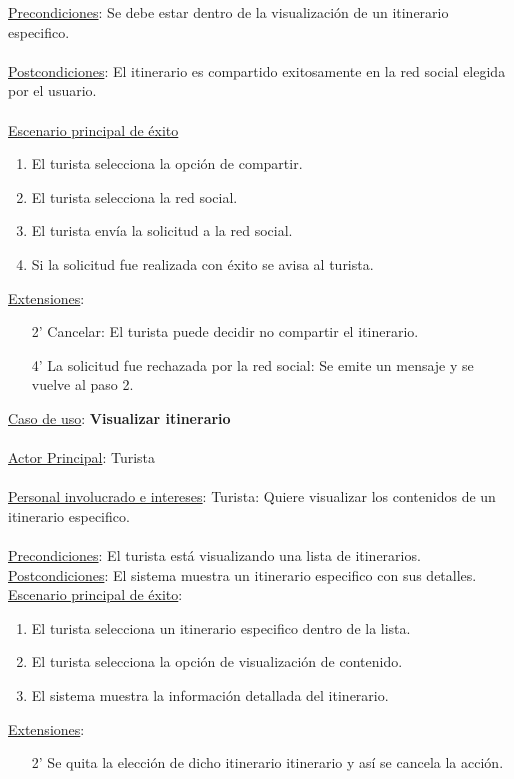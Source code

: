 \documentclass[12pt]{article}
\begin{document}
\underline{Precondiciones}: Se debe estar dentro de la visualización de un itinerario especifico.\\\\
\underline{Postcondiciones}: El itinerario es compartido exitosamente en la red social elegida por el usuario.\\\\
\underline{Escenario principal de éxito}
\begin{enumerate}
\item El turista selecciona la opción de compartir.
\item El turista selecciona la red social.
\item El turista envía la solicitud a la red social.
\item Si la solicitud fue realizada con éxito se avisa al turista.
\end{enumerate}
\underline{Extensiones}:
\begin{enumerate}
\item[2'] Cancelar: El turista puede decidir no compartir el itinerario.
\item[4'] La solicitud fue rechazada por la red social: Se emite un mensaje y se vuelve al paso 2.
\end{enumerate}
\underline{Caso de uso}: \textbf{Visualizar itinerario}\\\\
\underline{Actor Principal}: Turista\\\\
\underline{Personal involucrado e intereses}: Turista: Quiere visualizar los contenidos de un itinerario especifico.\\\\
\underline{Precondiciones}:  El turista está visualizando una lista de itinerarios. 
\underline{Postcondiciones}: El sistema muestra un itinerario especifico con sus detalles.
\underline{Escenario principal de éxito}:
\begin{enumerate}
\item El turista selecciona un itinerario especifico dentro de la lista.
\item El turista selecciona la opción de visualización de contenido.
\item El sistema muestra la información detallada del itinerario.
\end{enumerate}
\underline{Extensiones}:
\begin{enumerate}
\item[2'] Se quita la elección de dicho itinerario itinerario y así se cancela la acción.
\end{enumerate}
\end{document}
